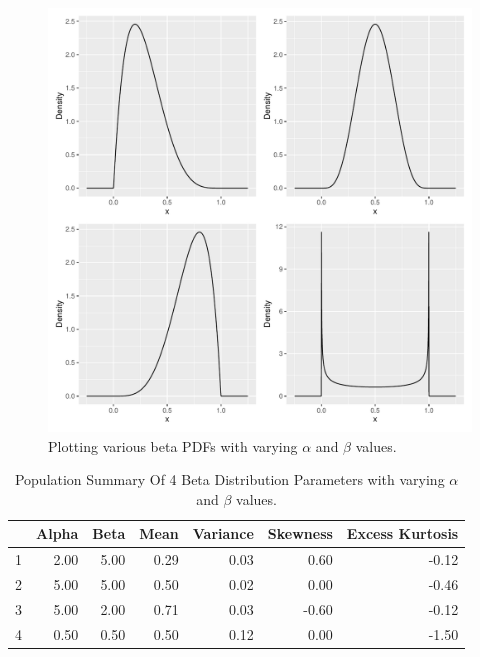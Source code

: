 \documentclass{article}\usepackage[]{graphicx}\usepackage[]{xcolor}
\begin{document}
\begin{figure}[ht]
  \begin{center}
  \includegraphics[width=\textwidth]{Rplot03.pdf}
  \caption{Plotting various beta PDFs with varying $\alpha$ and $\beta$ values.}
  \label{plot0}
  \end{center}
\end{figure}

\begin{table}[ht]
\centering
\caption{Population Summary Of 4 Beta Distribution Parameters with varying $\alpha$ and $\beta$ values.}
\label{table2}
\begin{tabular}{rrrrrrr}
  \hline
 & Alpha & Beta & Mean & Variance & Skewness & Excess Kurtosis \\ 
  \hline
1 & 2.00 & 5.00 & 0.29 & 0.03 & 0.60 & -0.12 \\ 
  2 & 5.00 & 5.00 & 0.50 & 0.02 & 0.00 & -0.46 \\ 
  3 & 5.00 & 2.00 & 0.71 & 0.03 & -0.60 & -0.12 \\ 
  4 & 0.50 & 0.50 & 0.50 & 0.12 & 0.00 & -1.50 \\ 
   \hline
\end{tabular}
\end{table}
\end{document}
